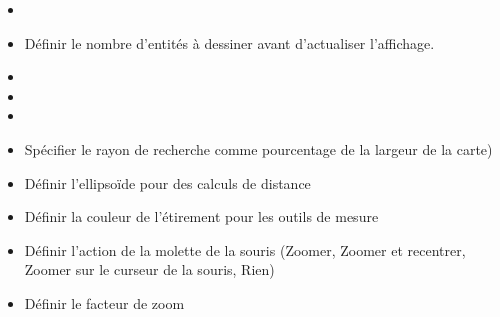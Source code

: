 
\begin{itemize}
\item {}
\item Définir le nombre d'entités à dessiner avant d'actualiser l'affichage.
\item {}
\item {}
\item {} 
\end{itemize}

%


\begin{itemize}
\item Spécifier le rayon de recherche comme pourcentage de la largeur de la carte)
\item Définir l'ellipsoïde pour des calculs de distance
\item Définir la couleur de l'étirement pour les outils de mesure
\item Définir l'action de la molette de la souris (Zoomer, Zoomer et recentrer, Zoomer sur le curseur de la souris, Rien)
\item Définir le facteur de zoom
\end{itemize}

%

